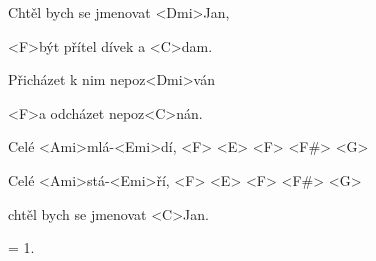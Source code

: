 

\zs
Chtěl bych se jmenovat <Dmi>Jan,

<F>být přítel dívek a <C>dam.

Přicházet k nim nepoz<Dmi>ván

<F>a odcházet nepoz<C>nán.
\ks

\zr
Celé <Ami>mlá-<Emi>dí, <F> <E> <F> <F#> <G>

Celé <Ami>stá-<Emi>ří, <F> <E> <F> <F#> <G>

chtěl bych se jmenovat <C>Jan.
\kr

\zs
= 1. 
\ks

\kp
